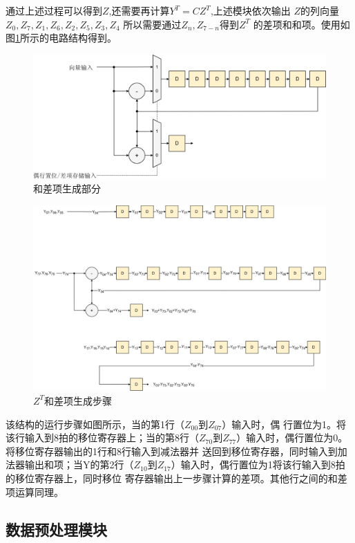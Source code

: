\documentclass{article}
\numberwithin {equation}{section}
\begin{document}
\begin{spacing}{1.25}
      通过上述过程可以得到$Z$,还需要再计算$Y^{T}=CZ^{T}$,上述模块依次输出
      $Z$的列向量$Z_{0},Z_{7},Z_{1},Z_{6},Z_{2},Z_{5},Z_{3},Z_{4}$
      所以需要通过$Z_{n},Z_{7-n}$得到$Z^{T}$
      的差项和和项。使用如图\ref{和差项生成}所示的电路结构得到。
      \begin{figure}[H]
        \centering
        \includegraphics[scale=0.8]{./pictures/和差项生成.png}
        \caption{和差项生成部分}
        \label{和差项生成}
      \end{figure}
      \begin{figure}[H]
        \centering
        \includegraphics[scale=0.8]{./pictures/和差项生成步骤.png}
        \caption{$Z^{T}$和差项生成步骤}
        \label{和差项生成步骤}
      \end{figure}
      该结构的运行步骤如图所示，当的第1行（$Z_{00}$到$Z_{07}$）输入时，偶
      行置位为1。将该行输入到8拍的移位寄存器上；当的第8行（$Z_{70}$到$Z_{
      77}$）输入时，偶行置位为0。将移位寄存器输出的1行和8行输入到减法器并
      送回到移位寄存器，同时输入到加法器输出和项；当Y的第2行（$Z_{10}$到$
      Z_{17}$）输入时，偶行置位为1将该行输入到8拍的移位寄存器上，同时移位
      寄存器输出上一步骤计算的差项。其他行之间的和差项运算同理。
  \subsection{数据预处理模块}
    \vspace{1em}

\end{spacing}
\end{document}
